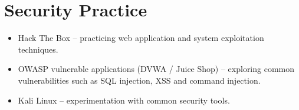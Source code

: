 \section{Security Practice}

\begin{itemize}

\item Hack The Box – practicing web application and system exploitation techniques.

\item OWASP vulnerable applications (DVWA / Juice Shop) – exploring common vulnerabilities such as SQL injection, XSS and command injection.

\item Kali Linux – experimentation with common security tools.

\end{itemize}